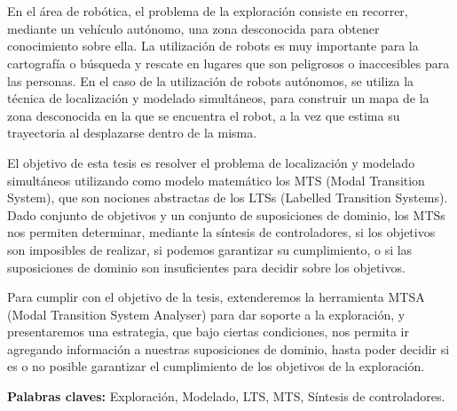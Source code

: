 \chapter*{\runtitulo}

\noindent
En el área de robótica, el problema de la exploración consiste en recorrer, mediante un vehículo autónomo,
una zona desconocida para obtener conocimiento sobre ella. La utilización de robots es muy importante para
la cartografía o búsqueda y rescate en lugares que son peligrosos o inaccesibles para las personas.
En el caso de la utilización de robots autónomos, se utiliza la técnica de localización y modelado simultáneos, 
para construir un mapa de la zona desconocida en la que se encuentra el robot, a la vez que estima su 
trayectoria al desplazarse dentro de la misma.

\vspace{\baselineskip}
El objetivo de esta tesis es resolver el problema de localización y modelado simultáneos utilizando como modelo 
matemático los MTS (Modal Transition System), que son nociones abstractas de los LTSs (Labelled Transition Systems).
Dado conjunto de objetivos y un conjunto de suposiciones de dominio, los MTSs nos permiten determinar, mediante la 
síntesis de controladores, si los objetivos son imposibles de realizar, si podemos garantizar su cumplimiento, o si 
las suposiciones de dominio son insuficientes para decidir sobre los objetivos.

\vspace{\baselineskip}
Para cumplir con el objetivo de la tesis, extenderemos la herramienta MTSA (Modal Transition System Analyser) para
dar soporte a la exploración, y presentaremos una estrategia, que bajo ciertas condiciones, nos permita ir agregando 
información a nuestras suposiciones de dominio, hasta poder decidir si es o no posible garantizar el cumplimiento de
los objetivos de la exploración.

\bigskip

\noindent\textbf{Palabras claves:} Exploración, Modelado, LTS, MTS, Síntesis de controladores.